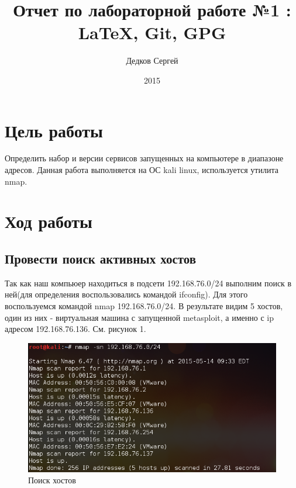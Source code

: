 \documentclass[11pt, a4paper]{article}		%
\author{Дедков Сергей}
\title{Отчет по лабораторной работе №1 :\\ \LaTeX{}, Git, GPG}
\date{2015}
\begin{document}
\maketitle
\tableofcontents
\newpage



\section{Цель работы}

Определить набор и версии сервисов запущенных на компьютере в диапазоне адресов.
Данная работа выполняется на ОС kali linux, используется утилита nmap.




\section{Ход работы}



\subsection{Провести поиск активных хостов}

Так как наш компьюер находиться в подсети 192.168.76.0/24 выполним поиск в ней(для определения воспользовались командой ifconfig). Для этого воспользуемся командой nmap 192.168.76.0/24.
В результате видим 5 хостов, один из них - виртуальная машина с запущенной metasploit, а именно с ip адресом 192.168.76.136. См. рисунок 1.

\begin{figure}[h!]
\centering
\includegraphics[scale=0.75]{res/hosts_search}
\caption{Поиск хостов}
\end{figure}
\end{document}
